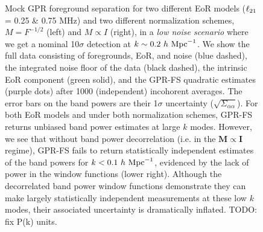 \documentclass[a4paper,fleqn,usenatbib]{mnras}
\def\M{\boldsymbol{M}}
\def\I{\boldsymbol{I}}
\def\ellto{\ell_{\rm 21}}
\begin{document}
\begin{figure}
\caption{Mock GPR foreground separation for two different EoR models ($\ellto$ = 0.25 \& 0.75 MHz) and two different normalization schemes, $M=F^{-1/2}$ (left) and $M\propto I$ (right), in a \emph{low noise scenario} where we get a nominal 10$\sigma$ detection at $k\sim0.2\ h\ {\rm Mpc}^{-1}$.
We show the full data consisting of foregrounds, EoR, and noise (blue dashed), the integrated noise floor of the data (black dashed), the intrinsic EoR component (green solid), and the GPR-FS quadratic estimates (purple dots) after 1000 (independent) incohorent averages.
The error bars on the band powers are their 1$\sigma$ uncertainty ($\sqrt{\Sigma_{\alpha\alpha}}$).
For both EoR models and under both normalization schemes, GPR-FS returns unbiased band power estimates at large $k$ modes.
However, we see that without band power decorrelation (i.e. in the $\M\propto\I$ regime), GPR-FS fails to return statistically independent estimates of the band powers for $k<0.1\ h\ {\rm Mpc}^{-1}$, evidenced by the lack of power in the window functions (lower right).
Although the decorrelated band power window functions demonstrate they can make largely statistically independent measurements at these low $k$ modes, their associated uncertainty is dramatically inflated.
TODO: fix P(k) units.
}
\label{fig:gpr_window_low_noise}
\end{figure}
\end{document}
